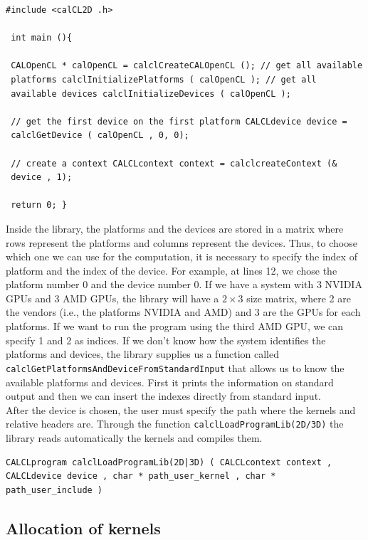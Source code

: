 \begin{lstlisting}
#include <calCL2D .h>

 int main (){

 CALOpenCL * calOpenCL = calclCreateCALOpenCL (); // get all available
 platforms calclInitializePlatforms ( calOpenCL ); // get all
 available devices calclInitializeDevices ( calOpenCL );

 // get the first device on the first platform CALCLdevice device =
 calclGetDevice ( calOpenCL , 0, 0);

 // create a context CALCLcontext context = calclcreateContext (&
 device , 1);

 return 0; }
\end{lstlisting}

Inside the library, the platforms and the devices are stored in a
matrix where rows represent the platforms and columns represent the
devices. Thus, to choose which one we can use for the computation,
it is necessary to specify the index of platform and the index of the
device. For example, at lines 12, we chose the platform number 0 and
the device number 0. If we have a system with 3 NVIDIA GPUs and 3 AMD
GPUs, the library will have a $2 \times 3$ size matrix, where 2 are the vendors
(i.e., the platforms NVIDIA and AMD) and 3 are the GPUs for each
platforms. If we want to run the program using the third AMD GPU, we can
specify 1 and 2 as indices. If we don't know how the system identifies
the platforms and devices, the library supplies us a function called
\verb'calclGetPlatformsAndDeviceFromStandardInput' that allows us to
know the available platforms and devices. First it prints the information on
standard output and then we can insert the indexes directly from
standard input.\\ After the device is chosen, the user must specify the
path where the kernels and relative headers are. Through the function
\verb'calclLoadProgramLib(2D/3D)' the library reads automatically the
kernels and compiles them.

\begin{lstlisting}
CALCLprogram calclLoadProgramLib(2D|3D) ( CALCLcontext context ,
CALCLdevice device , char * path_user_kernel , char *
path_user_include )
\end{lstlisting}

\subsection{Allocation of kernels}

